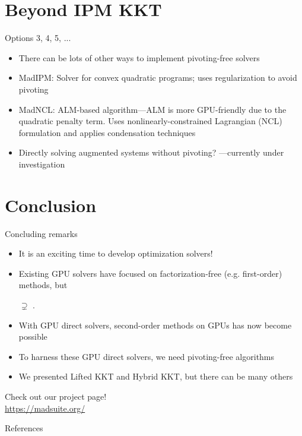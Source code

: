 \documentclass[aspectratio=169,11pt]{beamer}
\begin{document}
\section{Beyond IPM KKT}
\begin{frame}{Options 3, 4, 5, ...}
  \begin{itemize}
  \item There can be lots of other ways to implement pivoting-free solvers
  \item \alert{MadIPM}: Solver for convex quadratic programs; uses regularization to avoid pivoting \citep{montoisonGPUImplementationSecondOrder2025}
  \item \alert{MadNCL}: ALM-based algorithm---ALM is more \alert{GPU-friendly} due to the quadratic penalty term. Uses nonlinearly-constrained Lagrangian (NCL) formulation and applies condensation techniques \citep{montoisonMadNCLGPUImplementation2025}
  \item Directly solving augmented systems without pivoting? ---currently under investigation
  \end{itemize}
\end{frame}

\section{Conclusion}
\begin{frame}{Concluding remarks}
  \begin{itemize}
  \item It is an exciting time to develop optimization solvers!
  \item Existing GPU solvers have focused on \alert{factorization-free} (e.g. first-order) methods, but
    \begin{center}
       $\supsetneq$ .
    \end{center}
  \item With \alert{GPU direct solvers}, \alert{second-order methods} on GPUs has now become possible
  \item To harness these GPU direct solvers, we need \alert{pivoting-free algorithms}
  \item We presented \alert{Lifted KKT} and \alert{Hybrid KKT}, but there can be many others
  \end{itemize}
  \begin{center}
    Check out our project page!\\
    \url{https://madsuite.org/}
  \end{center}
\end{frame}

\AtNextBibliography{\tiny}
\begin{frame}{References}
\end{frame}
\end{document}
